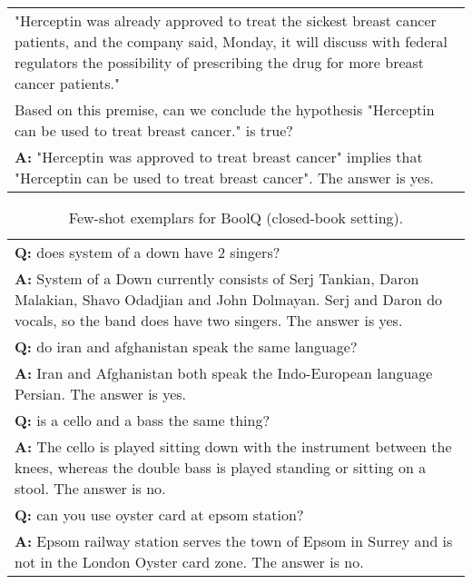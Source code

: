 \begin{table}[h]
\begin{tabular}{p{14cm}}
        "Herceptin was already approved to treat the sickest breast cancer patients, and the company said, Monday, it will discuss with federal regulators the possibility of prescribing the drug for more breast cancer patients."\\
        Based on this premise, can we conclude the hypothesis "Herceptin can be used to treat breast cancer." is true?\\
        \vspace{-1mm}
        \textbf{A:} "Herceptin was approved to treat breast cancer" implies that "Herceptin can be used to treat breast cancer". The answer is yes.\\
        \bottomrule
    \end{tabular}
    \label{tab:prompt-rte}
\end{table}

\begin{table}[h]
    \caption{
    Few-shot exemplars for BoolQ (closed-book setting).
    }
    \centering
    \small
    \begin{tabular}{p{14cm}}
        \toprule
        \textbf{Q:} does system of a down have 2 singers?\\
        \vspace{-1mm}
        \textbf{A:} System of a Down currently consists of Serj Tankian, Daron Malakian, Shavo Odadjian and John Dolmayan. Serj and Daron do vocals, so the band does have two singers. The answer is yes.\\
        \vspace{0mm}
        \textbf{Q:} do iran and afghanistan speak the same language?\\
        \vspace{-1mm}
        \textbf{A:} Iran and Afghanistan both speak the Indo-European language Persian. The answer is yes. \\
        \vspace{0mm}
        \textbf{Q:} is a cello and a bass the same thing?\\
        \vspace{-1mm}
        \textbf{A:} The cello is played sitting down with the instrument between the knees, whereas the double bass is played standing or sitting on a stool. The answer is no.\\
        \vspace{0mm}
        \textbf{Q:} can you use oyster card at epsom station?\\
        \vspace{-1mm}
        \textbf{A:} Epsom railway station serves the town of Epsom in Surrey and is not in the London Oyster card zone. The answer is no.\\
        \bottomrule
    \end{tabular}
    \label{tab:prompt-boolq-cb}
\end{table}